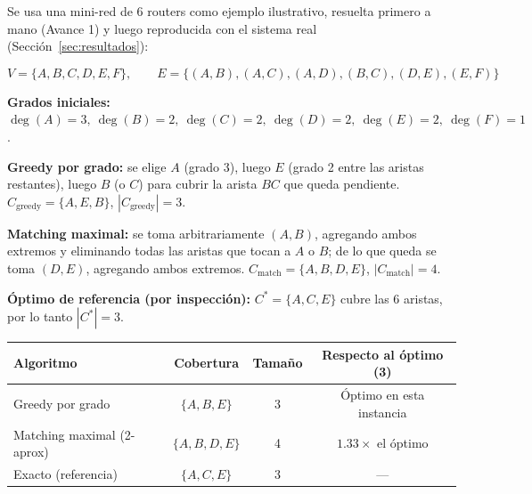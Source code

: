 \documentclass[11pt,a4paper]{article}
\begin{document}
Se usa una mini-red de 6 routers como ejemplo ilustrativo, resuelta primero a mano
(Avance 1) y luego reproducida con el sistema real (Sección~\ref{sec:resultados}):

\begin{center}
\end{center}

\[
V = \{A, B, C, D, E, F\}, \qquad
E = \{(A,B),(A,C),(A,D),(B,C),(D,E),(E,F)\}
\]

\textbf{Grados iniciales:} $\deg(A)=3,\ \deg(B)=2,\ \deg(C)=2,\ \deg(D)=2,\ \deg(E)=2,\ \deg(F)=1$.

\textbf{Greedy por grado:} se elige $A$ (grado 3), luego $E$ (grado 2 entre las aristas
restantes), luego $B$ (o $C$) para cubrir la arista $BC$ que queda pendiente.
$C_{\text{greedy}} = \{A, E, B\}$, $|C_{\text{greedy}}| = 3$.

\textbf{Matching maximal:} se toma arbitrariamente $(A,B)$, agregando ambos extremos y
eliminando todas las aristas que tocan a $A$ o $B$; de lo que queda se toma $(D,E)$,
agregando ambos extremos. $C_{\text{match}} = \{A, B, D, E\}$, $|C_{\text{match}}| = 4$.

\textbf{Óptimo de referencia (por inspección):} $C^{*} = \{A, C, E\}$ cubre las 6 aristas,
por lo tanto $|C^{*}| = 3$.

\begin{center}
\begin{tabular}{lccc}
	\toprule
	\textbf{Algoritmo} & \textbf{Cobertura} & \textbf{Tamaño} & \textbf{Respecto al óptimo (3)} \\
	\midrule
	Greedy por grado             & $\{A, B, E\}$    & 3 & Óptimo en esta instancia \\
	Matching maximal (2-aprox)   & $\{A, B, D, E\}$ & 4 & $1.33\times$ el óptimo \\
	Exacto (referencia)          & $\{A, C, E\}$    & 3 & --- \\
	\bottomrule
\end{tabular}
\end{center}
\end{document}
